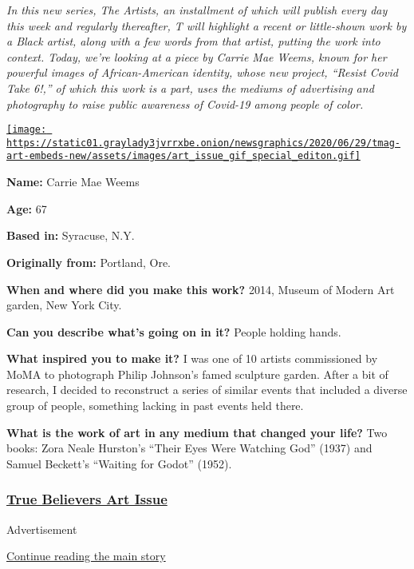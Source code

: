 \emph{In this new series, The Artists, an installment of which will
publish every day this week and regularly thereafter, T will highlight a
recent or little-shown work by a Black artist, along with a few words
from that artist, putting the work into context. Today, we're looking at
a piece by Carrie Mae Weems, known for her powerful images of
African-American identity, whose new project, ``Resist Covid Take 6!,''
of which this work is a part, uses the mediums of advertising and
photography to raise public awareness of Covid-19 among people of
color.}

\href{https://www.nytimes3xbfgragh.onion/issue/t-magazine/2020/07/02/true-believers-art-issue}{\texttt{[image: https://static01.graylady3jvrrxbe.onion/newsgraphics/2020/06/29/tmag-art-embeds-new/assets/images/art\_issue\_gif\_special\_editon.gif]}}

\textbf{Name:} Carrie Mae Weems

\textbf{Age:} 67

\textbf{Based in:} Syracuse, N.Y.

\textbf{Originally from:} Portland, Ore.

\textbf{When and where did you make this work?} 2014, Museum of Modern
Art garden, New York City.

\textbf{Can you describe what's going on in it?} People holding hands.

\textbf{What inspired you to make it?} I was one of 10 artists
commissioned by MoMA to photograph Philip Johnson's famed sculpture
garden. After a bit of research, I decided to reconstruct a series of
similar events that included a diverse group of people, something
lacking in past events held there.

\textbf{What is the work of art in any medium that changed your life?}
Two books: Zora Neale Hurston's ``Their Eyes Were Watching God'' (1937)
and Samuel Beckett's ``Waiting for Godot'' (1952).

\hypertarget{true-believers-art-issue}{%
\subsubsection{\texorpdfstring{\href{https://www.nytimes3xbfgragh.onion/issue/t-magazine/2020/07/02/true-believers-art-issue}{True
Believers Art
Issue}}{True Believers Art Issue}}\label{true-believers-art-issue}}

Advertisement

\protect\hyperlink{after-bottom}{Continue reading the main story}

